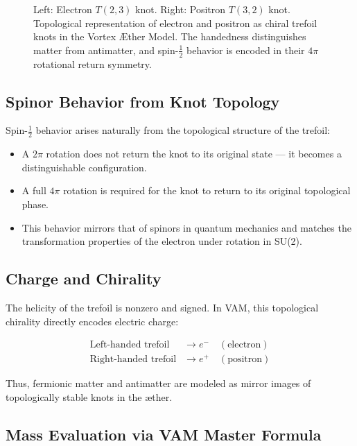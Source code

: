 \begin{figure}[H]
\begin{minipage}{0.45\textwidth}
\end{minipage}
\caption{Left: Electron \(T(2,3)\) knot. Right: Positron \(T(3,2)\) knot. Topological representation of electron and positron as chiral trefoil knots in the Vortex \AE{}ther Model. The handedness distinguishes matter from antimatter, and spin-\(\tfrac{1}{2}\) behavior is encoded in their \(4\pi\) rotational return symmetry. }
\label{fig:trefoil_knot_pair}
\end{figure}



\subsection{Spinor Behavior from Knot Topology}

Spin-\(\tfrac{1}{2}\) behavior arises naturally from the topological structure of the trefoil:

\begin{itemize}
    \item A \(2\pi\) rotation does not return the knot to its original state — it becomes a distinguishable configuration.
    \item A full \(4\pi\) rotation is required for the knot to return to its original topological phase.
    \item This behavior mirrors that of spinors in quantum mechanics and matches the transformation properties of the electron under rotation in SU(2).
\end{itemize}

\subsection{Charge and Chirality}

The helicity of the trefoil is nonzero and signed. In VAM, this topological chirality directly encodes electric charge:

\begin{align*}
\text{Left-handed trefoil} &\rightarrow e^- \quad (\text{electron}) \\
\text{Right-handed trefoil} &\rightarrow e^+ \quad (\text{positron})
\end{align*}

Thus, fermionic matter and antimatter are modeled as mirror images of topologically stable knots in the æther.

\subsection{Mass Evaluation via VAM Master Formula}

